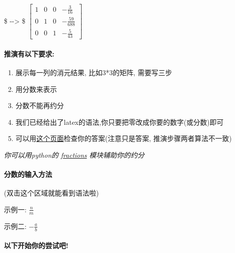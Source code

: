 \documentclass[11pt]{article}
\providecommand{\tightlist}{%
      \setlength{\itemsep}{0pt}\setlength{\parskip}{0pt}}
\begin{document}
\$ -\/-\textgreater{} \$
\(\begin{bmatrix}  1 & 0 & 0 & -\frac{3}{16}\\  0 & 1 & 0 & -\frac{59}{688}\\  0 & 0 & 1 & -\frac{5}{43}\end{bmatrix}\)

\paragraph{推演有以下要求:}\label{ux63a8ux6f14ux6709ux4ee5ux4e0bux8981ux6c42}

\begin{enumerate}
\def\labelenumi{\arabic{enumi}.}
\tightlist
\item
  展示每一列的消元结果, 比如3*3的矩阵, 需要写三步
\item
  用分数来表示
\item
  分数不能再约分
\item
  我们已经给出了latex的语法,你只要把零改成你要的数字(或分数)即可
\item
  可以用\href{http://www.math.odu.edu/~bogacki/cgi-bin/lat.cgi?c=sys}{这个页面}检查你的答案(注意只是答案,
  推演步骤两者算法不一致)
\end{enumerate}

\emph{你可以用python的
\href{https://docs.python.org/2/library/fractions.html}{fractions}
模块辅助你的约分}

    \paragraph{分数的输入方法}\label{ux5206ux6570ux7684ux8f93ux5165ux65b9ux6cd5}

(双击这个区域就能看到语法啦)

示例一: \(\frac{n}{m}\)

示例二: \(-\frac{a}{b}\)

    \paragraph{以下开始你的尝试吧!}\label{ux4ee5ux4e0bux5f00ux59cbux4f60ux7684ux5c1dux8bd5ux5427}
\end{document}
